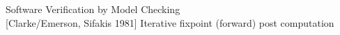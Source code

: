 



\begin{frame}{Software Verification by Model Checking\\
  \vspace{-0.25cm}\small{[Clarke/Emerson, Sifakis 1981]}}
  \centering
  Iterative fixpoint (forward) post computation

  \medskip
  \begin{minipage}[b]{0.8\textwidth}
    \resizebox{\textwidth}{!}{
      
    }
  \end{minipage}
\end{frame}

